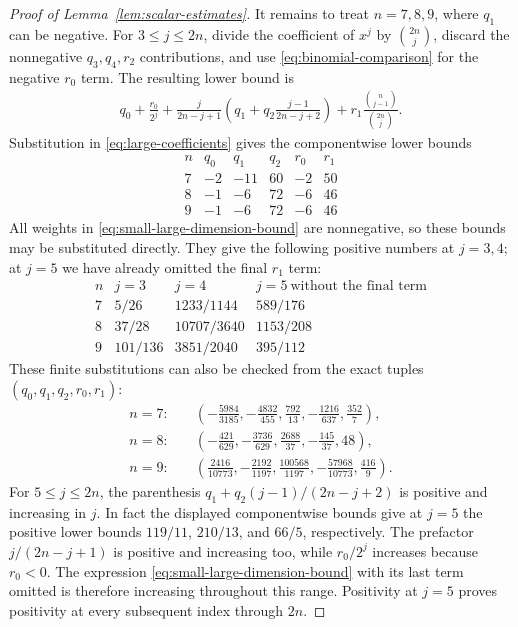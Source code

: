 \begin{proof}[Proof of Lemma~\ref{lem:scalar-estimates}]
It remains to treat $n=7,8,9$, where $q_1$ can be negative.
For $3\le j\le2n$, divide the coefficient of $x^j$ by
$\binom{2n}{j}$, discard the nonnegative $q_3,q_4,r_2$ contributions,
and use \eqref{eq:binomial-comparison} for the negative $r_0$ term.
The resulting lower bound is
\begin{equation}\label{eq:small-large-dimension-bound}
 \begin{split}
 q_0+\frac{r_0}{2^j}
 +\frac{j}{2n-j+1}
   \left(q_1+q_2\frac{j-1}{2n-j+2}\right)
 +r_1\frac{\binom n{j-1}}{\binom{2n}{j}}.
 \end{split}
\end{equation}
Substitution in \eqref{eq:large-coefficients} gives the componentwise
lower bounds
\[
\begin{array}{c|rrrrr}
 n&q_0&q_1&q_2&r_0&r_1\\ \hline
 7&-2&-11&60&-2&50\\
 8&-1&-6&72&-6&46\\
 9&-1&-6&72&-6&46
\end{array}
\]
All weights in \eqref{eq:small-large-dimension-bound} are nonnegative,
so these bounds may be substituted directly.  They give the following
positive numbers at $j=3,4$; at $j=5$ we have already omitted the final
$r_1$ term:
\[
\begin{array}{c|ccc}
 n&j=3&j=4&j=5\ \text{without the final term}\\ \hline
 7&5/26&1233/1144&589/176\\
 8&37/28&10707/3640&1153/208\\
 9&101/136&3851/2040&395/112
\end{array}
\]
These finite substitutions can also be checked from the exact tuples
$(q_0,q_1,q_2,r_0,r_1)$:
\begin{align*}
 n=7:&\quad
 \left(-\frac{5984}{3185},-\frac{4832}{455},
       \frac{792}{13},-\frac{1216}{637},\frac{352}{7}\right),\\
 n=8:&\quad
 \left(-\frac{421}{629},-\frac{3736}{629},
       \frac{2688}{37},-\frac{145}{37},48\right),\\
 n=9:&\quad
 \left(\frac{2416}{10773},-\frac{2192}{1197},
       \frac{100568}{1197},-\frac{57968}{10773},\frac{416}{9}\right).
\end{align*}
For $5\le j\le2n$, the parenthesis
$q_1+q_2(j-1)/(2n-j+2)$ is positive and increasing in $j$.
In fact the displayed componentwise bounds give at $j=5$ the positive
lower bounds $119/11$, $210/13$, and $66/5$, respectively.
The prefactor $j/(2n-j+1)$ is positive and increasing too, while
$r_0/2^j$ increases because $r_0<0$.  The expression
\eqref{eq:small-large-dimension-bound} with its last term omitted is
therefore increasing throughout this range.  Positivity at $j=5$
proves positivity at every subsequent index through $2n$.


\end{proof}
